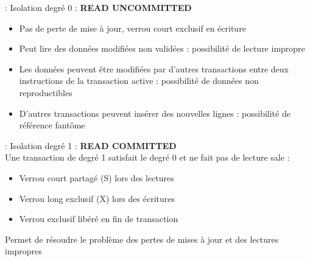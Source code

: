 \documentclass[10pt]{beamer}
\begin{document}
\begin{frame}{\secname : \subsecname}
    Isolation degré 0 : \textbf{READ UNCOMMITTED}
    \begin{itemize}
        \item Pas de perte de mise à jour, verrou court exclusif en écriture
        \item Peut lire des données modifiées non validées : possibilité de lecture impropre
        \item Les données peuvent être modifiées par d'autres transactions entre deux instructions de la transaction active : possibilité de données non reproductibles
        \item D'autres transactions peuvent insérer des nouvelles lignes : possibilité de référence fantôme
    \end{itemize}
\end{frame}

\begin{frame}{\secname : \subsecname}
    Isolation degré 1 : \textbf{READ COMMITTED} \\
    Une transaction de degré 1 satisfait le degré 0 et ne fait pas de lecture sale :
    \begin{itemize}
        \item Verrou court partagé (S) lors des lectures
        \item Verrou long exclusif (X) lors des écritures
        \item Verrou exclusif libéré en fin de transaction
    \end{itemize}
    Permet de résoudre le problème des pertes de mises à jour et des lectures impropres
\end{frame}
\end{document}
